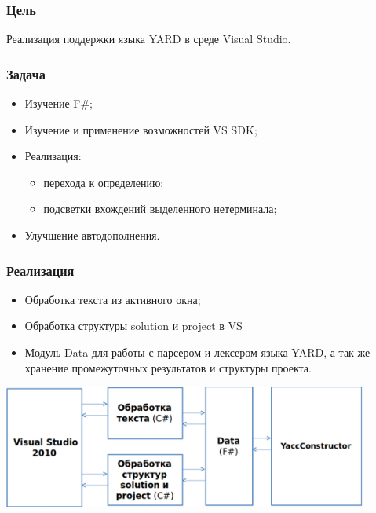 \documentclass{beamer}
\begin{document}
\begin{frame}
\frametitle{Цель}
    Реализация поддержки языка YARD в среде Visual Studio.
\end{frame}

\begin{frame}
	\transwipe[direction=90]
	\frametitle{Задача}
	\begin{itemize}
        \item Изучение F\#;
        \item Изучение и применение возможностей VS SDK;
        \item Реализация:
        	\begin{itemize}
            	\item перехода к определению;
            	\item подсветки вхождений выделенного нетерминала;
        	\end{itemize}
        \item Улучшение автодополнения.
    \end{itemize}
\end{frame}

\begin{frame}
	\transwipe[direction=90]
	\frametitle{Реализация}
	\begin{itemize}
        \item Обработка текста из активного окна;
        \item Обработка структуры solution и project в VS
        \item Модуль Data для работы с парсером и лексером языка YARD, а так же хранение промежуточных результатов и структуры проекта.
    \end{itemize}
    \begin{center}
        {\includegraphics[width= 0.9\textwidth, height=0.4\textheight]{diagrams/VSYard1.pdf}}
    \end{center}
\end{frame}
\end{document}
